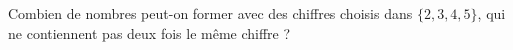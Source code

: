 Combien de nombres peut-on former avec des chiffres choisis dans $\{2, 3, 4, 5\}$, qui ne contiennent pas deux fois le même chiffre ?
